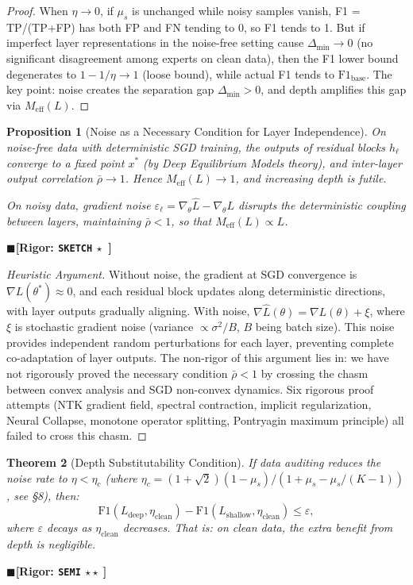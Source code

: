 \documentclass[12pt,a4paper]{article}
\newtheorem{theorem}{Theorem}[section]
\newtheorem{proposition}[theorem]{Proposition}
\theoremstyle{definition}
\theoremstyle{remark}
\newcommand{\rigorSemi}{$\blacksquare$\;\textbf{[Rigor: \texttt{SEMI} $\star\star\;$]}}
\newcommand{\rigorSketch}{$\blacksquare$\;\textbf{[Rigor: \texttt{SKETCH} $\star\;\;$]}}
\begin{document}
\begin{proof}
When $\eta \to 0$, if $\mu_s$ is unchanged while noisy samples vanish, F1 = TP/(TP+FP) has both FP and FN tending to 0, so F1 tends to 1. But if imperfect layer representations in the noise-free setting cause $\Delta_{\min} \to 0$ (no significant disagreement among experts on clean data), then the F1 lower bound degenerates to $1 - 1/\eta \to 1$ (loose bound), while actual F1 tends to $\mathrm{F1}_{\text{base}}$. The key point: noise creates the separation gap $\Delta_{\min} > 0$, and depth amplifies this gap via $M_{\text{eff}}(L)$.
\end{proof}

\begin{proposition}[Noise as a Necessary Condition for Layer Independence]
\label{prop:9}
On noise-free data with deterministic SGD training, the outputs of residual blocks $h_\ell$ converge to a fixed point $x^*$ (by Deep Equilibrium Models theory), and inter-layer output correlation $\bar{\rho} \to 1$. Hence $M_{\text{eff}}(L) \to 1$, and increasing depth is futile.

On noisy data, gradient noise $\varepsilon_\ell = \nabla_\theta \hat{L} - \nabla_\theta L$ disrupts the deterministic coupling between layers, maintaining $\bar{\rho} < 1$, so that $M_{\text{eff}}(L) \propto L$.
\end{proposition}
\rigorSketch

\begin{proof}[Heuristic Argument]
Without noise, the gradient at SGD convergence is $\nabla L(\theta^*) \approx 0$, and each residual block updates along deterministic directions, with layer outputs gradually aligning. With noise, $\nabla \hat{L}(\theta) = \nabla L(\theta) + \xi$, where $\xi$ is stochastic gradient noise (variance $\propto \sigma^2/B$, $B$ being batch size). This noise provides independent random perturbations for each layer, preventing complete co-adaptation of layer outputs. The non-rigor of this argument lies in: we have not rigorously proved the necessary condition $\bar{\rho} < 1$ by crossing the chasm between convex analysis and SGD non-convex dynamics. Six rigorous proof attempts (NTK gradient field, spectral contraction, implicit regularization, Neural Collapse, monotone operator splitting, Pontryagin maximum principle) all failed to cross this chasm.
\end{proof}

\begin{theorem}[Depth Substitutability Condition]
\label{thm:6.2}
If data auditing reduces the noise rate to $\eta < \eta_c$ (where $\eta_c = (1+\sqrt{2})(1-\mu_s)/(1+\mu_s-\mu_s/(K-1))$, see \S8), then:
\begin{equation}
\mathrm{F1}(L_{\text{deep}}, \eta_{\text{clean}}) - \mathrm{F1}(L_{\text{shallow}}, \eta_{\text{clean}}) \leq \varepsilon,
\end{equation}
where $\varepsilon$ decays as $\eta_{\text{clean}}$ decreases. That is: on clean data, the extra benefit from depth is negligible.
\end{theorem}
\rigorSemi
\end{document}
